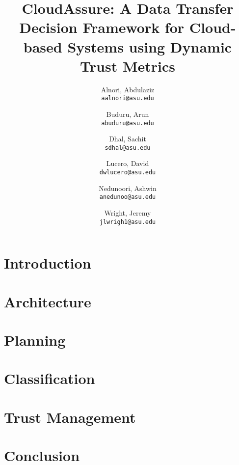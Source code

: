 \documentclass[12pt,a4paper]{report}
\title{CloudAssure: A Data Transfer Decision Framework for 
Cloud-based Systems using Dynamic Trust 
Metrics}
\author{
    Alnori, Abdulaziz \\ 
    \texttt{aalnori@asu.edu}
    \and
    Buduru, Arun\\
    \texttt{abuduru@asu.edu}
    \and
    Dhal, Sachit\\
    \texttt{sdhal@asu.edu}
    \and
    Lucero, David\\ 
    \texttt{dwlucero@asu.edu}
    \and
    Nedunoori, Ashwin\\
    \texttt{anedunoo@asu.edu}
    \and
    Wright, Jeremy\\
    \texttt{jlwrigh1@asu.edu}
}
\begin{document}
\maketitle
\tableofcontents
\clearpage
\printglossaries
\chapter{Introduction}


\chapter{Architecture}


\chapter{Planning}


\chapter{Classification}


\chapter{Trust Management}


\chapter{Conclusion}


\clearpage
\printbibliography
\end{document}
